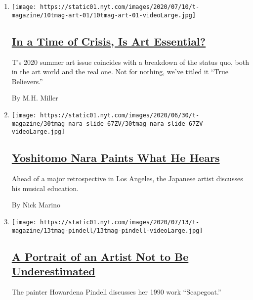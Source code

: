 \begin{enumerate}
\def\labelenumi{\arabic{enumi}.}
\item
  \texttt{[image: https://static01.nyt.com/images/2020/07/10/t-magazine/10tmag-art-01/10tmag-art-01-videoLarge.jpg]}

  \hypertarget{in-a-time-of-crisis-is-art-essential}{%
  \subsection{\texorpdfstring{\href{/2020/07/20/t-magazine/museums-galleries-open-art.html}{In
  a Time of Crisis, Is Art
  Essential?}}{In a Time of Crisis, Is Art Essential?}}\label{in-a-time-of-crisis-is-art-essential}}

  T's 2020 summer art issue coincides with a breakdown of the status
  quo, both in the art world and the real one. Not for nothing, we've
  titled it ``True Believers.''

  By M.H. Miller
\item
  \texttt{[image: https://static01.nyt.com/images/2020/06/30/t-magazine/30tmag-nara-slide-67ZV/30tmag-nara-slide-67ZV-videoLarge.jpg]}

  \hypertarget{yoshitomo-nara-paints-what-he-hears-1}{%
  \subsection{\texorpdfstring{\href{/2020/07/24/t-magazine/yoshitomo-nara.html}{Yoshitomo
  Nara Paints What He
  Hears}}{Yoshitomo Nara Paints What He Hears}}\label{yoshitomo-nara-paints-what-he-hears-1}}

  Ahead of a major retrospective in Los Angeles, the Japanese artist
  discusses his musical education.

  By Nick Marino
\item
  \texttt{[image: https://static01.nyt.com/images/2020/07/13/t-magazine/13tmag-pindell/13tmag-pindell-videoLarge.jpg]}

  \hypertarget{a-portrait-of-an-artist-not-to-be-underestimated-1}{%
  \subsection{\texorpdfstring{\href{/2020/07/24/t-magazine/howardena-pindell.html}{A
  Portrait of an Artist Not to Be
  Underestimated}}{A Portrait of an Artist Not to Be Underestimated}}\label{a-portrait-of-an-artist-not-to-be-underestimated-1}}

  The painter Howardena Pindell discusses her 1990 work ``Scapegoat.''


\end{enumerate}
